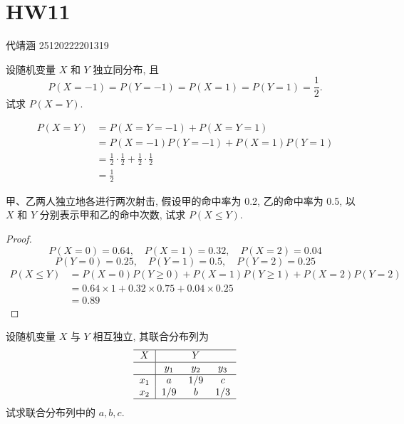\documentclass[../main.tex]{subfiles}
\begin{document}
\ifSubfilesClassLoaded{

    
    \setcounter{chapter}{10}
}{}

\chapter{ HW11 }
代靖涵 25120222201319
\begin{exercise}{}{}
设随机变量 $X$ 和 $Y$ 独立同分布, 且
\[
P(X = -1) = P(Y = -1) = P(X = 1) = P(Y = 1) = \frac{1}{2}.
\]
试求 $P(X=Y)$.
\end{exercise}
\begin{solution}
    \[
    \begin{aligned}
    P\left( X= Y \right)&= P\left( X= Y= -1 \right)+ P\left( X= Y= 1 \right)\\ 
     &=     P\left( X= -1 \right)P\left( Y= -1 \right)+ P\left( X= 1 \right)P\left( Y= 1 \right)\\ 
      &= \frac{1 }{2 }  \cdot \frac{1}{2}+ \frac{1}{2}\cdot \frac{1}{2}\\ 
       &= \frac{1}{2}   
    \end{aligned}
    \]
\end{solution}


\begin{exercise}{}{}
甲、乙两人独立地各进行两次射击, 假设甲的命中率为 0.2, 乙的命中率为 0.5, 以 $X$ 和 $Y$ 分别表示甲和乙的命中次数, 试求 $P(X \le Y)$.
\end{exercise}
\begin{proof}
    \[
    P\left( X= 0 \right)= 0.64, \quad P\left( X= 1 \right)= 0.32, \quad P\left( X= 2 \right)= 0.04   
    \]   \[
    P\left( Y= 0 \right)= 0.25 , \quad P\left( Y= 1 \right) =  0.5,\quad  P\left( Y= 2 \right)= 0.25   
    \]  \[
    \begin{aligned}
    P\left( X\le Y \right)&= P\left( X= 0 \right)P\left( Y\ge 0 \right)+ P\left( X= 1 \right)P\left( Y\ge 1 \right)+ P\left( X= 2 \right)P\left( Y= 2 \right)\\ 
     &= 0.64 \times    1 +  0.32 \times    0.75+ 0.04\times 0.25\\ 
      &= 0.89 
    \end{aligned}
    \]
\end{proof}
\begin{exercise}{}{}
设随机变量 $X$ 与 $Y$ 相互独立, 其联合分布列为
\[
\begin{tabular}{c|ccc}
\hline
$X$ & \multicolumn{3}{c}{$Y$} \\
\hline
 & $y_1$ & $y_2$ & $y_3$ \\
\hline
$x_1$ & $a$ & $1/9$ & $c$ \\
$x_2$ & $1/9$ & $b$ & $1/3$ \\
\hline
\end{tabular}
\]
试求联合分布列中的 $a,b,c$.
\end{exercise}
\end{document}
